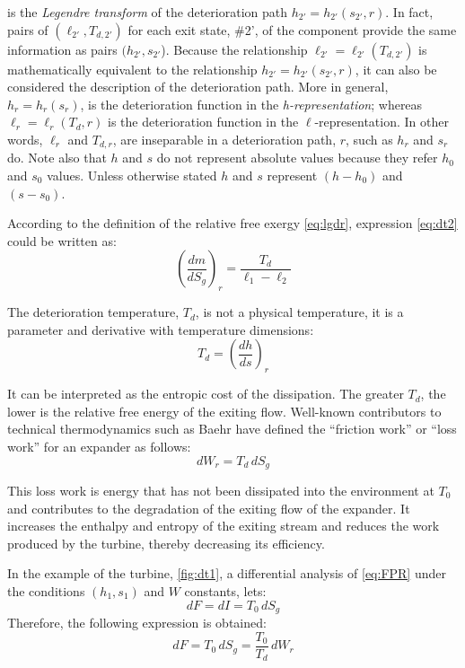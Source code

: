 \documentclass[energies,article,submit,moreauthors,pdftex]{Definitions/mdpi}
\begin{document}
 is the \emph{Legendre transform} of the deterioration path $h_{2'}=h_{2'}(s_{2'},r)$. In fact, pairs of $(\ell_{2'} , T_{d,2'})$ for each exit state, \#2', of the component provide the same information as pairs $(h_{2'},s_{2'}$). Because the relationship  $\ell_{2'} = \ell_{2'}(T_{d,2'})$ is mathematically equivalent to the relationship $h_{2'} = h_{2'} (s_{2'}, r)$, it can also be considered the description of the deterioration path. More in general, $h_r=h_r (s_r)$, is the deterioration function in the \emph{h-representation}; whereas $\ell_r = \ell_r(T_d,r)$ is the deterioration function in the $\ell$-representation. In other words, $\ell_r$ and $T_{d,r}$, are inseparable in a deterioration path, $r$, such as $h_r$ and $s_r$ do. Note also that $h$ and $s$ do not represent absolute values because they refer $h_0$ and $s_0$ values. Unless otherwise stated $h$ and $s$ represent $(h-h_0)$ and $(s-s_0)$.

According to the definition of the relative free exergy \cref{eq:lgdr}, expression \eqref{eq:dt2} could be written as:
\begin{equation}
\left(\frac{dm}{dS_g}\right)_r = \frac{T_d}{\ell_1 - \ell_2}
\label{eq:dt2g}
\end{equation}

The deterioration temperature, $T_d$, is not a physical temperature, it is a parameter and derivative with temperature dimensions:  
\begin{equation}
T_d=\left(\frac{dh}{ds}\right)_r
\end{equation}      

It can be interpreted as the entropic cost of the dissipation. The greater $T_d$, the lower is the relative free energy of the exiting flow.
Well-known contributors to technical thermodynamics such as Baehr \cite{Baehr2005,Baehr1979} have defined the “friction work” or “loss work” for an expander as follows: 
\begin{equation}
	dW_r=T_d\,dS_g
\end{equation}

This loss work is energy that has not been dissipated into the environment at $T_0$ and contributes to the degradation of the exiting flow of the expander. It increases the enthalpy and entropy of the exiting stream and reduces the work produced by the turbine, thereby decreasing its efficiency.

In the example of the turbine, \cref{fig:dt1}, a differential analysis of \cref{eq:FPR} under the conditions $(h_1,s_1)$ and $W$ constants, lets:
\begin{equation}
dF=dI=T_0\,dS_g
\end{equation}
Therefore, the following expression is obtained:
\begin{equation}
dF=T_0\,dS_g=\frac{T_0}{T_d}\,dW_r
\end{equation}
\end{document}
